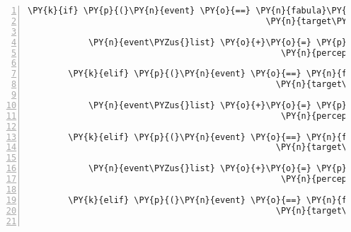 \begin{Verbatim}[commandchars=\\\{\},numbers=left,firstnumber=1,stepnumber=1]
        \PY{k}{if} \PY{p}{(}\PY{n}{event} \PY{o}{==} \PY{n}{fabula}\PY{o}{.}\PY{n}{TriesToLookAtEvent}\PY{p}{(}\PY{n}{identifier}\PY{o}{=}\PY{n}{ID\PYZus{}KUNI}\PY{p}{,}
                                               \PY{n}{target\PYZus{}identifier}\PY{o}{=}\PY{l+s}{\PYZsq{}}\PY{l+s}{dew}\PY{l+s}{\PYZsq{}}\PY{p}{)}\PY{p}{)}\PY{p}{:}

            \PY{n}{event\PYZus{}list} \PY{o}{+}\PY{o}{=} \PY{p}{[}\PY{n}{fabula}\PY{o}{.}\PY{n}{PerceptionEvent}\PY{p}{(}\PY{n}{identifier}\PY{o}{=}\PY{n}{ID\PYZus{}KUNI}\PY{p}{,}
                                                  \PY{n}{perception}\PY{o}{=}\PY{l+s}{\PYZsq{}}\PY{l+s}{Tau von den Blumen}\PY{l+s}{\PYZsq{}}\PY{p}{)}\PY{p}{]}

        \PY{k}{elif} \PY{p}{(}\PY{n}{event} \PY{o}{==} \PY{n}{fabula}\PY{o}{.}\PY{n}{TriesToLookAtEvent}\PY{p}{(}\PY{n}{identifier}\PY{o}{=}\PY{n}{ID\PYZus{}KUNI}\PY{p}{,}
                                                 \PY{n}{target\PYZus{}identifier}\PY{o}{=}\PY{l+s}{\PYZsq{}}\PY{l+s}{goblet}\PY{l+s}{\PYZsq{}}\PY{p}{)}\PY{p}{)}\PY{p}{:}

            \PY{n}{event\PYZus{}list} \PY{o}{+}\PY{o}{=} \PY{p}{[}\PY{n}{fabula}\PY{o}{.}\PY{n}{PerceptionEvent}\PY{p}{(}\PY{n}{identifier}\PY{o}{=}\PY{n}{ID\PYZus{}KUNI}\PY{p}{,}
                                                  \PY{n}{perception}\PY{o}{=}\PY{l+s}{\PYZsq{}}\PY{l+s}{Ein schöner Blütenkelch}\PY{l+s}{\PYZsq{}}\PY{p}{)}\PY{p}{]}

        \PY{k}{elif} \PY{p}{(}\PY{n}{event} \PY{o}{==} \PY{n}{fabula}\PY{o}{.}\PY{n}{TriesToLookAtEvent}\PY{p}{(}\PY{n}{identifier}\PY{o}{=}\PY{n}{ID\PYZus{}KUNI}\PY{p}{,}
                                                 \PY{n}{target\PYZus{}identifier}\PY{o}{=}\PY{l+s}{\PYZsq{}}\PY{l+s}{string\PYZus{}harp}\PY{l+s}{\PYZsq{}}\PY{p}{)}\PY{p}{)}\PY{p}{:}

            \PY{n}{event\PYZus{}list} \PY{o}{+}\PY{o}{=} \PY{p}{[}\PY{n}{fabula}\PY{o}{.}\PY{n}{PerceptionEvent}\PY{p}{(}\PY{n}{identifier}\PY{o}{=}\PY{n}{ID\PYZus{}KUNI}\PY{p}{,}
                                                  \PY{n}{perception}\PY{o}{=}\PY{l+s}{\PYZsq{}}\PY{l+s}{Die Saite einer Harfe}\PY{l+s}{\PYZsq{}}\PY{p}{)}\PY{p}{]}

        \PY{k}{elif} \PY{p}{(}\PY{n}{event} \PY{o}{==} \PY{n}{fabula}\PY{o}{.}\PY{n}{TriesToLookAtEvent}\PY{p}{(}\PY{n}{identifier}\PY{o}{=}\PY{n}{ID\PYZus{}KUNI}\PY{p}{,}
                                                 \PY{n}{target\PYZus{}identifier}\PY{o}{=}\PY{l+s}{\PYZsq{}}\PY{l+s}{lute}\PY{l+s}{\PYZsq{}}\PY{p}{)}\PY{p}{)}\PY{p}{:}


\end{Verbatim}
